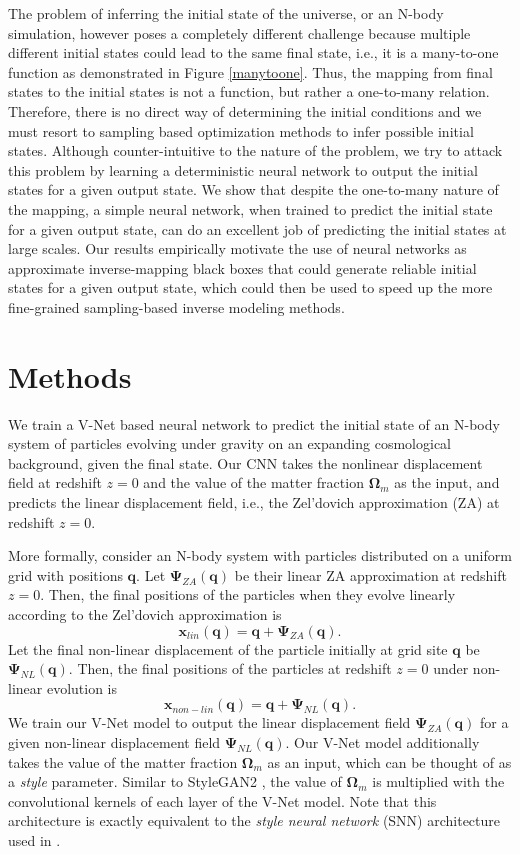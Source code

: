 \documentclass[11pt]{article}
\begin{document}
The problem of inferring the initial state of the universe, or an N-body simulation, however poses a completely different challenge because multiple different initial states could lead to the same final state, i.e., it is a many-to-one function as demonstrated in Figure \ref{manytoone}. Thus, the mapping from final states to the initial states is not a function, but rather a one-to-many relation. Therefore, there is no direct way of determining the initial conditions and we must resort to sampling based optimization methods to infer possible initial states. Although counter-intuitive to the nature of the problem, we try to attack this problem by learning a deterministic neural network to output the initial states for a given output state. We show that despite the one-to-many nature of the mapping, a simple neural network, when trained to predict the initial state for a given output state, can do an excellent job of predicting the initial states at large scales. Our results empirically motivate the use of neural networks as approximate inverse-mapping black boxes that could generate reliable initial states for a given output state, which could then be used to speed up the more fine-grained sampling-based inverse modeling methods.

\section{Methods}

We train a V-Net based neural network to predict the initial state of an N-body system of particles evolving under gravity on an expanding cosmological background, given the final state. Our CNN takes the nonlinear displacement field at redshift $z=0$ and the value of the matter fraction $\mathbf{\Omega}_m$ as the input, and predicts the linear displacement field, i.e., the Zel'dovich approximation (ZA) at redshift $z=0$.

More formally, consider an N-body system with particles distributed on a uniform grid with positions $\mathbf{q}$. Let $\mathbf{\Psi}_{ZA}(\mathbf{q})$ be their linear ZA approximation at redshift $z=0$. Then, the final positions of the particles when they evolve linearly according to the Zel'dovich approximation is
$$\mathbf{x}_{lin}(\mathbf{q}) = \mathbf{q} + \mathbf{\Psi}_{ZA}(\mathbf{q}).$$
Let the final non-linear displacement of the particle initially at grid site $\mathbf{q}$ be $\mathbf{\Psi}_{NL}(\mathbf{q})$. Then, the final positions of the particles at redshift $z=0$ under non-linear evolution is
$$\mathbf{x}_{non-lin}(\mathbf{q}) = \mathbf{q} + \mathbf{\Psi}_{NL}(\mathbf{q}).$$
We train our V-Net model to output the linear displacement field $\mathbf{\Psi}_{ZA}(\mathbf{q})$ for a given non-linear displacement field $\mathbf{\Psi}_{NL}(\mathbf{q})$. Our V-Net model additionally takes the value of the matter fraction $\mathbf{\Omega}_m$ as an input, which can be thought of as a \textit{style} parameter. Similar to StyleGAN2 \cite{stylegan2}, the value of $\mathbf{\Omega}_m$ is multiplied with the convolutional kernels of each layer of the V-Net model. Note that this architecture is exactly equivalent to the \textit{style neural network} (SNN) architecture used in \cite{forward-model}.
\end{document}
